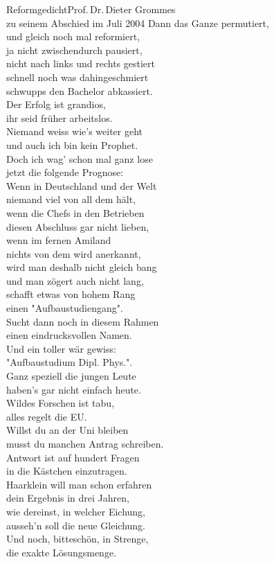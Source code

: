 \begin{lied*}{Reformgedicht}{Prof.\,Dr.\,Dieter Grommes\\zu seinem Abschied im Juli 2004}
Dann das Ganze permutiert,\\
und gleich noch mal reformiert,\\
ja nicht zwischendurch pausiert,\\
nicht nach links und rechts gestiert\\
schnell noch was dahingeschmiert\\
schwupps den Bachelor abkassiert.\\

Der Erfolg ist grandios,\\
ihr seid früher arbeitslos.\\

Niemand weiss wie's weiter geht\\
und auch ich bin kein Prophet.\\
Doch ich wag' schon mal ganz lose\\
jetzt die folgende Prognose:\\

Wenn in Deutschland und der Welt\\
niemand viel von all dem hält,\\
wenn die Chefs in den Betrieben\\
diesen Abschluss gar nicht lieben,\\
wenn im fernen Amiland\\
nichts von dem wird anerkannt,\\
wird man deshalb nicht gleich bang\\
und man zögert auch nicht lang,\\
schafft etwas von hohem Rang\\
einen "Aufbaustudiengang".\\
Sucht dann noch in diesem Rahmen\\
einen eindrucksvollen Namen.\\
Und ein toller wär gewiss:\\
"Aufbaustudium Dipl. Phys.".\\

Ganz speziell die jungen Leute\\
haben's gar nicht einfach heute.\\
Wildes Forschen ist tabu,\\
alles regelt die EU.\\

Willst du an der Uni bleiben\\
musst du manchen Antrag schreiben.\\
Antwort ist auf hundert Fragen\\
in die Kästchen einzutragen.\\
Haarklein will man schon erfahren\\
dein Ergebnis in drei Jahren,\\
wie dereinst, in welcher Eichung,\\
ausseh'n soll die neue Gleichung.\\
Und noch, bitteschön, in Strenge,\\
die exakte Lösungsmenge.\\


\end{lied*}
